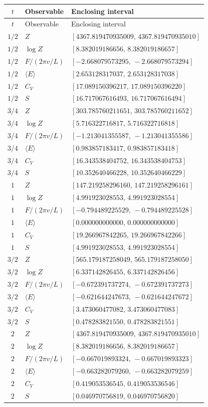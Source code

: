 \begingroup\footnotesize
\setlength{\tabcolsep}{5pt}
\begin{longtable}{@{}cll@{}}
\toprule
$t$ & Observable & Enclosing interval\\
\midrule\endfirsthead
\toprule
$t$ & Observable & Enclosing interval\\
\midrule\endhead
\bottomrule\endfoot
$1/2$ & $Z$ & $[4367.819470935009,\,4367.819470935010]$\\
$1/2$ & $\log Z$ & $[8.382019186656,\,8.382019186657]$\\
$1/2$ & $F/(2\pi v/L)$ & $[-2.668079573295,\,-2.668079573294]$\\
$1/2$ & $\langle E\rangle$ & $[2.653128317037,\,2.653128317038]$\\
$1/2$ & $C_V$ & $[17.089150396217,\,17.089150396220]$\\
$1/2$ & $S$ & $[16.717067616493,\,16.717067616494]$\\
$3/4$ & $Z$ & $[303.785760211651,\,303.785760211652]$\\
$3/4$ & $\log Z$ & $[5.716322716817,\,5.716322716818]$\\
$3/4$ & $F/(2\pi v/L)$ & $[-1.213041355587,\,-1.213041355586]$\\
$3/4$ & $\langle E\rangle$ & $[0.983857183417,\,0.983857183418]$\\
$3/4$ & $C_V$ & $[16.343538404752,\,16.343538404753]$\\
$3/4$ & $S$ & $[10.352640466228,\,10.352640466229]$\\
$1$ & $Z$ & $[147.219258296160,\,147.219258296161]$\\
$1$ & $\log Z$ & $[4.991923028553,\,4.991923028554]$\\
$1$ & $F/(2\pi v/L)$ & $[-0.794489225529,\,-0.794489225528]$\\
$1$ & $\langle E\rangle$ & $[0.000000000000,\,0.000000000000]$\\
$1$ & $C_V$ & $[19.266967842265,\,19.266967842266]$\\
$1$ & $S$ & $[4.991923028553,\,4.991923028554]$\\
$3/2$ & $Z$ & $[565.179187258049,\,565.179187258050]$\\
$3/2$ & $\log Z$ & $[6.337142826455,\,6.337142826456]$\\
$3/2$ & $F/(2\pi v/L)$ & $[-0.672391737274,\,-0.672391737273]$\\
$3/2$ & $\langle E\rangle$ & $[-0.621644247673,\,-0.621644247672]$\\
$3/2$ & $C_V$ & $[3.473060477082,\,3.473060477083]$\\
$3/2$ & $S$ & $[0.478283821550,\,0.478283821551]$\\
$2$ & $Z$ & $[4367.819470935009,\,4367.819470935010]$\\
$2$ & $\log Z$ & $[8.382019186656,\,8.382019186657]$\\
$2$ & $F/(2\pi v/L)$ & $[-0.667019893324,\,-0.667019893323]$\\
$2$ & $\langle E\rangle$ & $[-0.663282079260,\,-0.663282079259]$\\
$2$ & $C_V$ & $[0.419053536545,\,0.419053536546]$\\
$2$ & $S$ & $[0.046970756819,\,0.046970756820]$\\
\end{longtable}

